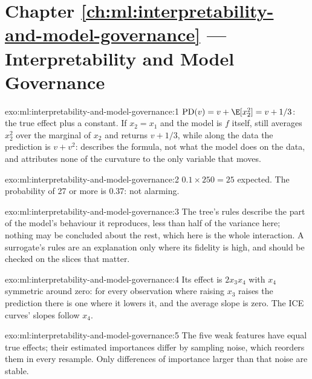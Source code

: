 \section*{Chapter \ref{ch:ml:interpretability-and-model-governance} --- Interpretability and Model Governance}

\begin{solution}{exo:ml:interpretability-and-model-governance:1}
$\mathrm{PD}(v) = v + \E[x_2^2] = v + 1/3$: the true effect plus a constant. If $x_2 = x_1$ and the model is $f$ itself,
 still averages $x_2^2$ over the marginal of $x_2$ and returns $v + 1/3$, while along the data the
prediction is $v + v^2$:  describes the formula, not what the model does on the data, and attributes none
of the curvature to the only variable that moves.
\end{solution}

\begin{solution}{exo:ml:interpretability-and-model-governance:2}
$0.1\times250 = 25$ expected. The probability of 27 or more is 0.37: not alarming.
\end{solution}

\begin{solution}{exo:ml:interpretability-and-model-governance:3}
The tree's rules describe the part of the model's behaviour it reproduces, less than half of the variance here; nothing may be
concluded about the rest, which here is the whole interaction. A surrogate's rules are an explanation only where its fidelity
is high, and should be checked on the slices that matter.
\end{solution}

\begin{solution}{exo:ml:interpretability-and-model-governance:4}
Its effect is $2x_3x_4$ with $x_4$ symmetric around zero: for every observation where raising $x_3$ raises the prediction there
is one where it lowers it, and the average slope is zero. The ICE curves' slopes follow $x_4$.
\end{solution}

\begin{solution}{exo:ml:interpretability-and-model-governance:5}
The five weak features have equal true effects; their estimated importances differ by sampling noise, which reorders them in
every resample. Only differences of importance larger than that noise are stable.
\end{solution}

